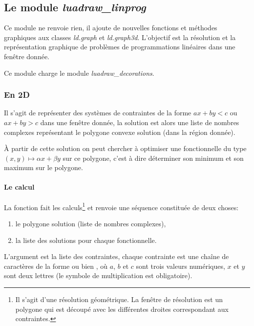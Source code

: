 \subsection{Le module \emph{luadraw\_linprog}}

Ce module ne renvoie rien, il ajoute de nouvelles fonctions et méthodes graphiques aux classes \emph{ld.graph} et \emph{ld.graph3d}. L'objectif est la résolution et la représentation graphique de problèmes de programmations linéaires dans une fenêtre donnée.

Ce module charge le module \emph{luadraw\_decorations}.

\subsubsection{En 2D}

Il s'agit de représenter des systèmes de contraintes de la forme $ax+by<c$ ou $ax+by>c$ dans une fenêtre donnée, la solution est alors une liste de nombres complexes représentant le polygone convexe solution (dans la région donnée). 

À partir de cette solution on peut chercher à optimiser une fonctionnelle du type $(x,y)\mapsto \alpha x+\beta y$ sur ce polygone, c'est à dire déterminer son minimum et son maximum sur le polygone.

\paragraph{Le calcul}

La fonction  fait les calculs\footnote{Il s'agit d'une résolution géométrique. La fenêtre de résolution est un polygone qui est découpé avec les différentes droites correspondant aux contraintes.} et renvoie une séquence constituée de deux choses: 
    \begin{enumerate}
        \item le polygone solution (liste de nombres complexes),
        \item la liste des solutions pour chaque fonctionnelle.
    \end{enumerate}
    
L'argument  est la liste des contraintes, chaque contrainte est une chaîne de caractères de la forme  ou bien , où $a$, $b$ et $c$ sont trois valeurs numériques, $x$ et $y$ sont deux lettres (le symbole de multiplication est obligatoire).

